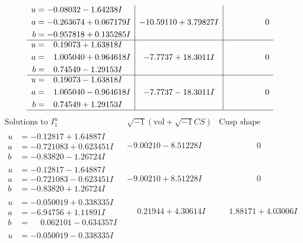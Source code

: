 \documentclass[1p]{elsarticle_modified}
\theoremstyle{definition}
\newcommand{\I}{\sqrt{-1}}
\begin{document}
$$\begin{array}{c|c|c}
\begin{aligned}
u &= -0.08032 - 1.64238 I \\
a &= -0.263674 + 0.067179 I \\
b &= -0.957818 + 0.135285 I\end{aligned}
 & -10.59110 + 3.79827 I & \phantom{-0.000000 } 0 \\ \hline\begin{aligned}
u &= \phantom{-}0.19073 + 1.63818 I \\
a &= \phantom{-}1.005040 + 0.964618 I \\
b &= \phantom{-}0.74549 - 1.29153 I\end{aligned}
 & -7.7737 + 18.3011 I & \phantom{-0.000000 } 0 \\ \hline\begin{aligned}
u &= \phantom{-}0.19073 - 1.63818 I \\
a &= \phantom{-}1.005040 - 0.964618 I \\
b &= \phantom{-}0.74549 + 1.29153 I\end{aligned}
 & -7.7737 - 18.3011 I & \phantom{-0.000000 } 0\\
 \hline 
 \end{array}$$\newpage$$\begin{array}{c|c|c}  
\text{Solutions to }I^u_{1}& \I (\text{vol} + \sqrt{-1}CS) & \text{Cusp shape}\\
 \hline 
\begin{aligned}
u &= -0.12817 + 1.64887 I \\
a &= -0.721083 + 0.623451 I \\
b &= -0.83820 - 1.26724 I\end{aligned}
 & -9.00210 - 8.51228 I & \phantom{-0.000000 } 0 \\ \hline\begin{aligned}
u &= -0.12817 - 1.64887 I \\
a &= -0.721083 - 0.623451 I \\
b &= -0.83820 + 1.26724 I\end{aligned}
 & -9.00210 + 8.51228 I & \phantom{-0.000000 } 0 \\ \hline\begin{aligned}
u &= -0.050019 + 0.338335 I \\
a &= -6.94756 + 1.11891 I \\
b &= \phantom{-}0.062101 - 0.634357 I\end{aligned}
 & \phantom{-}0.21944 + 4.30614 I & \phantom{-}1.88171 + 4.03006 I \\ \hline\begin{aligned}
u &= -0.050019 - 0.338335 I \\

\end{aligned}
\end{array}$$
\end{document}
